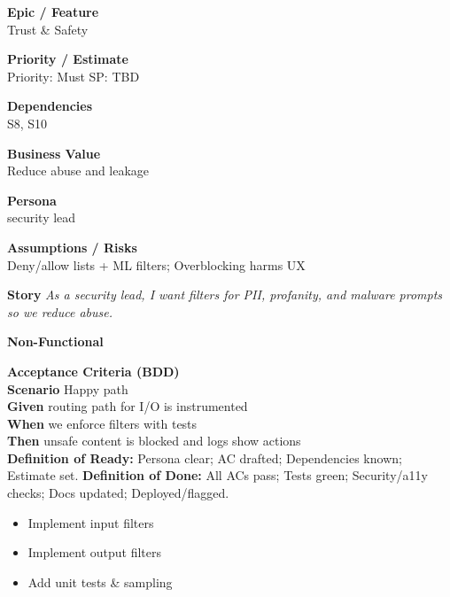 \documentclass[11pt,a4paper]{article}
\newenvironment{StoryCard}[2][]{
  \begin{tcolorbox}[enhanced, breakable, sharp corners=all, colback=cardback, colframe=cardframe,
    title={#2}, fonttitle=\bfseries\large, boxrule=0.6pt, borderline west={2pt}{0pt}{accent}, #1]
}{
  \end{tcolorbox}
}
\newcommand{\badge}[1]{\pill{\footnotesize #1}}
\newcommand{\cb}{\(\square\)}
\newenvironment{TasksBox}[1][Tasks]{%
  \begin{tcolorbox}[enhanced,breakable,
    colback=cardback, colframe=cardframe, title={#1},
    borderline west={1.8pt}{0pt}{MidnightBlue},
    arc=2pt, boxrule=0.4pt,
    left=10pt,right=10pt,top=6pt,bottom=6pt,
    before skip=6pt, after skip=10pt
  ]
  \small
  \begin{itemize}[label=\cb, leftmargin=*, labelsep=0.6em, itemsep=4pt, topsep=2pt, parsep=0pt]
}{%
  \end{itemize}
  \end{tcolorbox}
}
\begin{document}
\begin{StoryCard}{S11 — Input/output filtering}
\noindent\begin{minipage}[t]{0.49\textwidth}
\textbf{Epic / Feature}\\
Trust \& Safety

\medskip
\textbf{Priority / Estimate}\\
Priority: Must \quad SP: TBD

\medskip
\textbf{Dependencies}\\
S8, S10
\end{minipage}\hfill
\begin{minipage}[t]{0.49\textwidth}
\textbf{Business Value}\\
Reduce abuse and leakage

\medskip
\textbf{Persona}\\
security lead

\medskip
\textbf{Assumptions / Risks}\\
Deny/allow lists + ML filters; Overblocking harms UX
\end{minipage}

\medskip
\textbf{Story} \emph{As a security lead, I want filters for PII, profanity, and malware prompts so we reduce abuse.}

\medskip
\textbf{Non-Functional}
\badge{Security}\ \badge{Privacy}

\medskip
\textbf{Acceptance Criteria (BDD)}\\
\textbf{Scenario} Happy path\\
\textbf{Given} routing path for I/O is instrumented\\
\textbf{When} we enforce filters with tests\\
\textbf{Then} unsafe content is blocked and logs show actions\\

\medskip
\footnotesize \textbf{Definition of Ready:} Persona clear; AC drafted; Dependencies known; Estimate set.\quad
\textbf{Definition of Done:} All ACs pass; Tests green; Security/a11y checks; Docs updated; Deployed/flagged.
\end{StoryCard}

\begin{TasksBox}[Tasks]
  \item Implement input filters
  \item Implement output filters
  \item Add unit tests \& sampling
\end{TasksBox}
\clearpage
\end{document}
